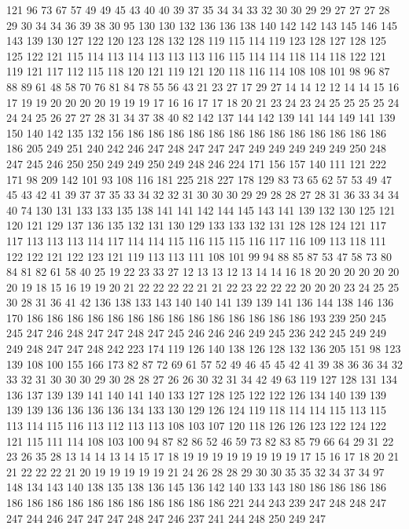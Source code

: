 121 96 73 67 57 49 49 45 43 40 40 39 37 35 34 34 33 32 30 30
29 29 27 27 27 28 29 30 34 34 36 39 38 30 95 130 130 132 136 136
138 140 142 142 143 145 146 145 143 139 130 127 122 120 123 128 132 128 119 115
114 119 123 128 127 128 125 125 122 121 115 114 113 114 113 113 113 116 115 114
114 118 114 118 122 121 119 121 117 112 115 118 120 121 119 121 120 118 116 114
108 108 101 98 96 87 88 89 61 48 58 70 76 81 84 78 55 56 43 21
23 27 17 29 27 14 14 12 12 14 14 15 16 17 19 19 20 20 20 20
19 19 19 17 16 16 17 17 18 20 21 23 24 23 24 25 25 25 25 24
24 24 25 26 27 27 28 31 34 37 38 40 82 142 137 144 142 139 141 144
149 141 139 150 140 142 135 132 156 186 186 186 186 186 186 186 186 186 186 186
186 186 186 205 249 251 240 242 246 247 248 247 247 247 249 249 249 249 249 250
248 247 245 246 250 250 249 249 250 249 248 246 224 171 156 157 140 111 121 222
171 98 209 142 101 93 108 116 181 225 218 227 178 129 83 73 65 62 57 53
49 47 45 43 42 41 39 37 37 35 33 34 32 32 31 30 30 30 29 29
28 28 27 28 31 36 33 34 34 40 74 130 131 133 133 135 138 141 141 142
144 145 143 141 139 132 130 125 121 120 121 129 137 136 135 132 131 130 129 133
133 132 131 128 128 124 121 117 117 113 113 113 114 117 114 114 115 116 115 115
116 117 116 109 113 118 111 122 122 121 122 123 121 119 113 113 111 108 101 99
94 88 85 87 53 47 58 73 80 84 81 82 61 58 40 25 19 22 23 33
27 12 13 13 12 13 14 14 16 18 20 20 20 20 20 20 20 19 18 15
16 19 19 20 21 22 22 22 22 21 21 22 23 22 22 22 20 20 20 23
24 25 25 30 28 31 36 41 42 136 138 133 143 140 140 141 139 139 141 136
144 138 146 136 170 186 186 186 186 186 186 186 186 186 186 186 186 186 186 193
239 250 245 245 247 246 248 247 247 248 247 245 246 246 246 249 245 236 242 245
249 249 249 248 247 247 248 242 223 174 119 126 140 138 126 128 132 136 205 151
98 123 139 108 100 155 166 173 82 87 72 69 61 57 52 49 46 45 45 42
41 39 38 36 36 34 32 33 32 31 30 30 30 29 30 28 28 27 26 26
30 32 31 34 42 49 63 119 127 128 131 134 136 137 139 139 141 140 141 140
133 127 128 125 122 122 126 134 140 139 139 139 139 136 136 136 136 134 133 130
129 126 124 119 118 114 114 115 113 115 113 114 115 116 113 112 113 113 108 103
107 120 118 126 126 123 122 124 122 121 115 111 114 108 103 100 94 87 82 86
52 46 59 73 82 83 85 79 66 64 29 31 22 23 26 35 28 13 14 14
13 14 15 17 18 19 19 19 19 19 19 19 19 17 15 16 17 18 20 21
21 22 22 22 21 20 19 19 19 19 19 21 24 26 28 28 29 30 30 35
35 32 34 37 34 97 148 134 143 140 138 135 138 136 145 136 142 140 133 143
180 186 186 186 186 186 186 186 186 186 186 186 186 186 186 186 221 244 243 239
247 248 248 247 247 244 246 247 247 247 248 247 246 237 241 244 248 250 249 247
